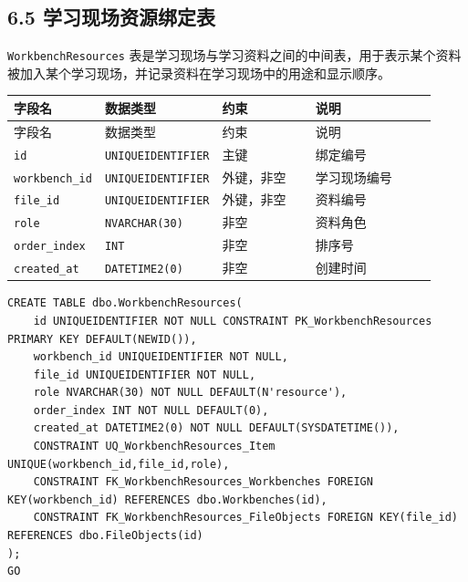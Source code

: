 \documentclass[10pt,a4paper,fontset=none]{ctexart}
\begin{document}
\subsection*{6.5 学习现场资源绑定表}

\texttt{WorkbenchResources} 表是学习现场与学习资料之间的中间表，用于表示某个资料被加入某个学习现场，并记录资料在学习现场中的用途和显示顺序。\par

\begingroup\scriptsize
\renewcommand{\arraystretch}{1.18}
\setlength{\LTleft}{0pt}
\setlength{\LTright}{0pt}
\begin{longtable}{>{\raggedright\arraybackslash}p{0.20\linewidth}>{\raggedright\arraybackslash}p{0.16\linewidth}>{\raggedright\arraybackslash}p{0.24\linewidth}>{\raggedright\arraybackslash}p{0.32\linewidth}}
\toprule
字段名 & 数据类型 & 约束 & 说明 \\
\midrule
\endfirsthead
\toprule
字段名 & 数据类型 & 约束 & 说明 \\
\midrule
\endhead
\texttt{id} & \texttt{UNIQUEIDENTIFIER} & 主键 & 绑定编号 \\
\texttt{workbench\_id} & \texttt{UNIQUEIDENTIFIER} & 外键，非空 & 学习现场编号 \\
\texttt{file\_id} & \texttt{UNIQUEIDENTIFIER} & 外键，非空 & 资料编号 \\
\texttt{role} & \texttt{NVARCHAR(30)} & 非空 & 资料角色 \\
\texttt{order\_index} & \texttt{INT} & 非空 & 排序号 \\
\texttt{created\_at} & \texttt{DATETIME2(0)} & 非空 & 创建时间 \\
\bottomrule
\end{longtable}
\endgroup


\begin{Verbatim}[fontsize=\scriptsize,frame=single]
CREATE TABLE dbo.WorkbenchResources(
    id UNIQUEIDENTIFIER NOT NULL CONSTRAINT PK_WorkbenchResources PRIMARY KEY DEFAULT(NEWID()),
    workbench_id UNIQUEIDENTIFIER NOT NULL,
    file_id UNIQUEIDENTIFIER NOT NULL,
    role NVARCHAR(30) NOT NULL DEFAULT(N'resource'),
    order_index INT NOT NULL DEFAULT(0),
    created_at DATETIME2(0) NOT NULL DEFAULT(SYSDATETIME()),
    CONSTRAINT UQ_WorkbenchResources_Item UNIQUE(workbench_id,file_id,role),
    CONSTRAINT FK_WorkbenchResources_Workbenches FOREIGN KEY(workbench_id) REFERENCES dbo.Workbenches(id),
    CONSTRAINT FK_WorkbenchResources_FileObjects FOREIGN KEY(file_id) REFERENCES dbo.FileObjects(id)
);
GO
\end{Verbatim}
\end{document}
